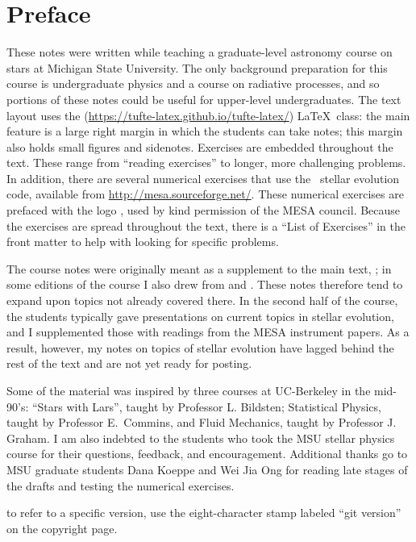 
\section*{Preface}
These notes were written while teaching a graduate-level astronomy course on stars at Michigan State University.  The only background preparation for this course is undergraduate physics and a course on radiative processes, and so portions of these notes could be useful for upper-level undergraduates.  
The text layout uses the  (\url{https://tufte-latex.github.io/tufte-latex/}) \LaTeX\ class:  the main feature is a large right margin in which the students can take notes; this margin also holds small figures and sidenotes. Exercises are embedded throughout the text.  These range from ``reading exercises'' to longer, more challenging problems.  In addition, there are several numerical exercises that use the \mesa\ stellar evolution code, available from \url{http://mesa.sourceforge.net/}.  These numerical exercises are prefaced with the logo , used by kind permission of the MESA council. Because the exercises are spread throughout the text, there is a ``List of Exercises'' in the front matter to help with looking for specific problems.

The course notes were originally meant as a supplement to the main text, ; in some editions of the course I also drew from  and .  These notes therefore tend to expand upon topics not already covered there.  In the second half of the course, the students typically gave presentations on current topics in stellar evolution, and I supplemented those with readings from the MESA instrument papers\cite{Paxton2010Modules-for-Exp,Paxton2013Modules-for-Exp}.  As a result, however, my notes on topics of stellar evolution have lagged behind the rest of the text and are not yet ready for posting. 

Some of the material was inspired by three courses at UC-Berkeley in the mid-90's: ``Stars with Lars'', taught by Professor L. Bildsten; Statistical Physics, taught by Professor E.~Commins, and Fluid Mechanics, taught by Professor J. Graham.  I am also indebted to the students who took the MSU stellar physics course for their questions, feedback, and encouragement. Additional thanks go to MSU graduate students Dana Koeppe and Wei Jia Ong for reading late stages of the drafts and testing the numerical exercises.

 to refer to a specific version, use the eight-character stamp labeled ``git version'' on the copyright page.
